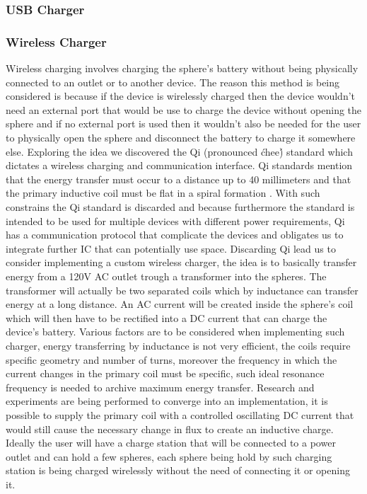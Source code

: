 \subsubsection{USB Charger}
\subsubsection{Wireless Charger}
Wireless charging involves charging the sphere's battery without being physically connected to an outlet or to another device. The reason this method is being considered is because if the device is wirelessly charged then the device wouldn't need an external port that would be use to charge the device without opening the sphere and if no external port is used then it wouldn't also be needed for the user to physically open the sphere and disconnect the battery to charge it somewhere else. Exploring the idea we discovered the Qi (pronounced \'chee\') standard which dictates a wireless charging and communication interface. Qi standards mention that the energy transfer must occur to a distance up to 40 millimeters and that the primary inductive coil must be flat in a spiral formation \cite{QiStandard}. With such constrains the Qi standard is discarded and because furthermore the standard is intended to be used for multiple devices with different power requirements, Qi has a communication protocol that complicate the devices and obligates us to integrate further IC that can potentially use space. Discarding Qi lead us to consider implementing a custom wireless charger, the idea is to basically transfer energy from a 120V AC outlet trough a transformer into the spheres. The transformer will actually be two separated coils which by inductance can transfer energy at a long distance. An AC current will be created inside the sphere's coil which will then have to be rectified into a DC current that can charge the device's battery. Various factors are to be considered when implementing such charger, energy transferring by inductance is not very efficient, the coils require specific geometry and number of turns, moreover the frequency in which the current changes in the primary coil must be specific, such ideal resonance frequency is needed to archive maximum energy transfer. Research and experiments are being performed to converge into an implementation, it is possible to supply the primary coil with a controlled oscillating DC current that would still cause the necessary change in flux to create an inductive charge. Ideally the user will have a charge station that will be connected to a power outlet and can hold a few spheres, each sphere being hold by such charging station is being charged wirelessly without the need of connecting it or opening it. 
